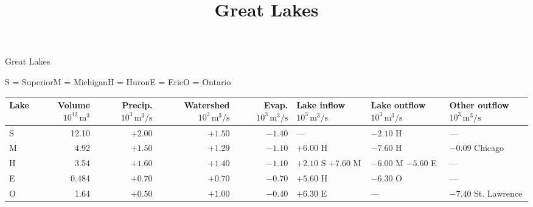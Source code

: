 \documentclass[11pt,aspectratio=169]{beamer}
\title{Great Lakes}
\date{}
\begin{document}
\begin{frame}{Great Lakes}
\centering

\par\smallskip
{\footnotesize S = Superior\quad M = Michigan\quad H = Huron\quad E = Erie\quad O = Ontario\par}

\smallskip
\footnotesize
\setlength{\tabcolsep}{3pt}
\renewcommand{\arraystretch}{1.35}
\begin{tabular}{lrrrrlll}
\toprule
Lake & \shortstack{Volume\\$10^{12}\,\mathrm{m^3}$}
 & \shortstack{Precip.\\$10^3\,\mathrm{m^3/s}$}
 & \shortstack{Watershed\\$10^3\,\mathrm{m^3/s}$}
 & \shortstack{Evap.\\$10^3\,\mathrm{m^3/s}$}
 & \shortstack{Lake inflow\\$10^3\,\mathrm{m^3/s}$}
 & \shortstack{Lake outflow\\$10^3\,\mathrm{m^3/s}$}
 & \shortstack{Other outflow\\$10^3\,\mathrm{m^3/s}$} \\
\midrule
S & 12.10 & $+2.00$ & $+1.50$ & $-1.40$ & --- & $-2.10$ H & --- \\
M & 4.92 & $+1.50$ & $+1.29$ & $-1.10$ & $+6.00$ H & $-7.60$ H & $-0.09$ Chicago \\
H & 3.54 & $+1.60$ & $+1.40$ & $-1.10$
 & \shortstack[l]{$+2.10$ S\\$+7.60$ M}
 & \shortstack[l]{$-6.00$ M\\$-5.60$ E} & --- \\
E & 0.484 & $+0.70$ & $+0.70$ & $-0.70$ & $+5.60$ H & $-6.30$ O & --- \\
O & 1.64 & $+0.50$ & $+1.00$ & $-0.40$ & $+6.30$ E & --- & $-7.40$ St. Lawrence \\
\bottomrule
\end{tabular}

\end{frame}
\end{document}
